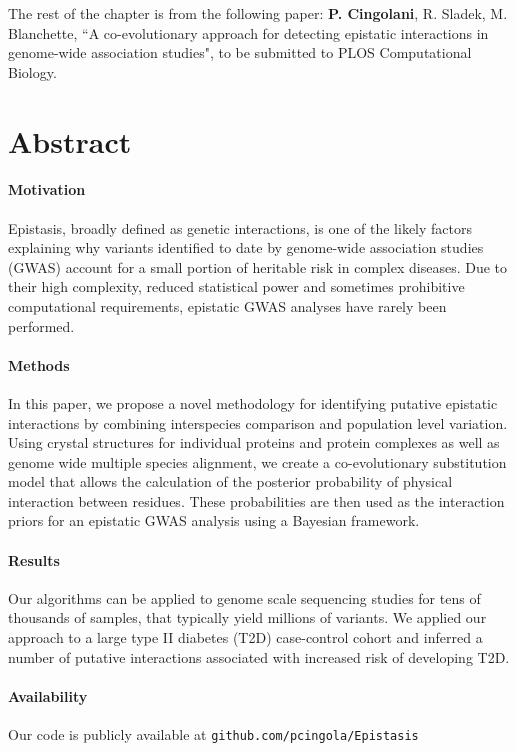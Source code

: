 The rest of the chapter is from the following paper: \textbf{P. Cingolani}, R. Sladek, M. Blanchette, ``A co-evolutionary approach for detecting epistatic interactions in genome-wide association studies", to be submitted to PLOS Computational Biology.

\section{Abstract}

\paragraph{Motivation} Epistasis, broadly defined as genetic interactions, is one of the likely factors explaining why variants identified to date by genome-wide association studies (GWAS) account for a small portion of heritable risk in complex diseases. 
Due to their high complexity, reduced statistical power and sometimes prohibitive computational requirements, epistatic GWAS analyses have rarely been performed. 

\paragraph{Methods} In this paper, we propose a novel methodology for identifying putative epistatic interactions by combining interspecies comparison and population level variation. 
Using crystal structures for individual proteins and protein complexes as well as genome wide multiple species alignment, we create a co-evolutionary substitution model that allows the calculation of the posterior probability of physical interaction between residues. 
These probabilities are then used as the interaction priors for an epistatic GWAS analysis using a Bayesian framework. 

\paragraph{Results} Our algorithms can be applied to genome scale sequencing studies for tens of thousands of samples, that typically yield millions of variants. 
We applied our approach to a large type II diabetes (T2D) case-control cohort and inferred a number of putative interactions associated with increased risk of developing T2D. 

\paragraph{Availability} Our code is publicly available at \texttt{github.com/pcingola/Epistasis}

